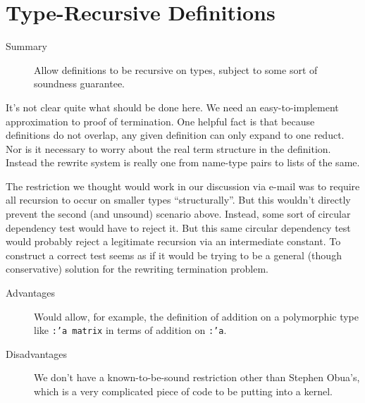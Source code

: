 \documentclass[11pt]{article}
\begin{document}
\section{Type-Recursive Definitions}
\label{sec:type-recurs-defin}

\begin{description}
\item[Summary] Allow definitions to be recursive on types, subject to
  some sort of soundness guarantee.
\end{description}

It's not clear quite what should be done here.  We need an
easy-to-implement approximation to proof of termination.  One helpful
fact is that because definitions do not overlap, any given definition
can only expand to one reduct.  Nor is it necessary to worry about the
real term structure in the definition.  Instead the rewrite system is
really one from name-type pairs to lists of the same.

The restriction we thought would work in our discussion via e-mail was
to require all recursion to occur on smaller types ``structurally''.
But this wouldn't directly prevent the second (and unsound) scenario
above.  Instead, some sort of circular dependency test would have to
reject it.  But this same circular dependency test would probably
reject a legitimate recursion via an intermediate constant.  To
construct a correct test seems as if it would be trying to be a
general (though conservative) solution for the rewriting termination
problem.

\begin{description}
\item[Advantages] Would allow, for example, the definition of addition
  on a polymorphic type like \texttt{:'a~matrix} in terms of addition
  on \texttt{:'a}.
\item[Disadvantages] We don't have a known-to-be-sound restriction
  other than Stephen Obua's, which is a very complicated piece of code
  to be putting into a kernel.
\end{description}
\end{document}
